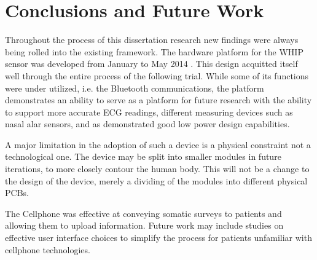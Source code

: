 \chapter{Conclusions and Future Work}

Throughout the process of this dissertation research new findings were always being rolled into the existing framework. The hardware platform for the WHIP sensor was developed from January to May 2014 . This design acquitted itself well through the entire process of the following trial. While some of its functions were under utilized, i.e. the Bluetooth communications, the platform demonstrates an ability to serve as a platform for future research with the ability to support more accurate ECG readings, different  measuring devices such as nasal alar sensors, and as demonstrated good low power design capabilities. 

A major limitation in the adoption of such a device is a physical constraint not a technological one. The device may be split into smaller modules in future iterations, to more closely contour the human body. This will not be a change to the design of the device, merely a dividing of the modules into different physical PCBs.

The Cellphone was effective at conveying somatic surveys to patients and allowing them to upload information. Future work may include studies on effective user interface choices to simplify the process for patients unfamiliar with cellphone technologies.